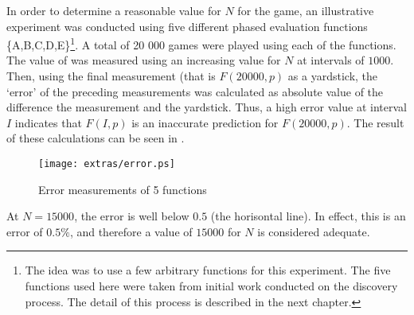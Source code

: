 In order to determine a reasonable value for $N$ for the  game, an illustrative experiment was conducted using five different phased evaluation functions \{A,B,C,D,E\}\footnote{The idea was to use a few arbitrary functions for this experiment. The five functions used here were taken from initial work conducted on the discovery process. The detail of this process is described in the next chapter.}. A total of 20 000 games were played using each of the functions. The value of  was measured using an increasing value for $N$ at intervals of  $1000$.  Then, using the final measurement (that is $F(20000,p)$ as a yardstick, the `error' of the preceding measurements was calculated as absolute value of the difference the measurement and the yardstick.  Thus, a high error value at interval $I$ indicates that $F(I,p)$ is an inaccurate prediction for $F(20000,p)$.  The result of these calculations can be seen in .
\begin{figure}[htp]
	\centering
		\texttt{[image: extras/error.ps]}
	\caption{Error measurements of 5 functions}
	\label{fig:error}
\end{figure}
At $N = 15000$, the error is well below $0.5$ (the horisontal line). In effect, this is an error of $0.5\%$, and therefore a value of $15000$ for $N$ is considered adequate.
%
%
